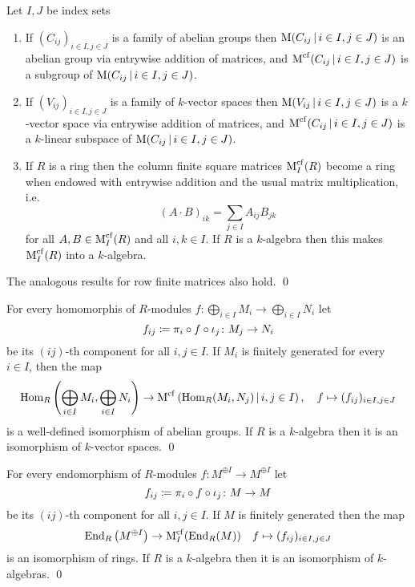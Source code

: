 \begin{lemma}
  \label{lemma: structure on infinite matrices}
  Let $I, J$ be index sets
  \begin{enumerate}
    \item
      If $(C_{ij})_{i \in I, j \in J}$ is a family of abelian groups then $\Mat(C_{ij} \suchthat i \in I, j \in J)$ is an abelian group via entrywise addition of matrices, and $\Mat^{\cf}(C_{ij} \suchthat i \in I, j \in J)$ is a subgroup of $\Mat(C_{ij} \suchthat i \in I, j \in J)$.
    \item
      If $(V_{ij})_{i \in I, j \in J}$ is a family of $k$-vector spaces then $\Mat(V_{ij} \suchthat i \in I, j \in J)$ is a $k$-vector space via entrywise addition of matrices, and $\Mat^{\cf}(C_{ij} \suchthat i \in I, j \in J)$ is a $k$-linear subspace of $\Mat(C_{ij} \suchthat i \in I, j \in J)$.
    \item
      If $R$ is a ring then the column finite square matrices $\operatorname{M}^{{\operatorname{cf}}}_I(R)$ become a ring when endowed with entrywise addition and the usual matrix multiplication, i.e.\
      \[
          (A \cdot B)_{ik}
        = \sum_{j \in I} A_{ij} B_{jk}
      \]
      for all $A, B \in \operatorname{M}^{{\operatorname{cf}}}_I(R)$ and all $i, k \in I$.
      If $R$ is a $k$-algebra then this makes $\operatorname{M}^{{\operatorname{cf}}}_I(R)$ into a $k$-algebra.
  \end{enumerate}
  The analogous results for row finite matrices also hold.
  \qed
\end{lemma}


\begin{corollary}
  For every homomorphis of $R$-modules $f \colon \bigoplus_{i \in I} M_i \to \bigoplus_{i \in I} N_i$ let
  \[
              f_{ij}
    \coloneqq  \pi_i \circ f \circ \iota_j
    \colon    M_j
    \to       N_i
  \]
  be its $(ij)$-th component for all $i, j \in I$.
  If $M_i$ is finitely generated for every $i \in I$, then the map
  \[
            \Hom_R\left( \bigoplus_{i \in I} M_i, \bigoplus_{i \in I} N_i \right)
    \to     \Mat^{\cf}\left( \Hom_R(M_i, N_j) \suchthat i,j \in I \right),
    \quad   f
    \mapsto (f_{ij})_{i \in I, j \in J}
  \]
  is a well-defined isomorphism of abelian groups.
  If $R$ is a $k$-algebra then it is an isomorphism of $k$-vector spaces.
  \qed
\end{corollary}


\begin{corollary}
  \label{corollary: endomorphism ring of sum power of fg module}
  For every endomorphism of $R$-modules $f \colon M^{\oplus I} \to M^{\oplus I}$ let
  \[
              f_{ij}
    \coloneqq  \pi_i \circ f \circ \iota_j
    \colon    M
    \to       M
  \]
  be its $(ij)$-th component for all $i, j \in I$.
  If $M$ is finitely generated then the map
    \[
            \operatorname{End}_R\left( M^{\oplus I} \right)
    \to     \operatorname{M}^{{\operatorname{cf}}}_I( \operatorname{End}_R(M) )
    \quad   f
    \mapsto (f_{ij})_{i \in I, j \in J}
  \]
  is an isomorphism of rings.
  If $R$ is a $k$-algebra then it is an isomorphism of $k$-algebras.
  \qed
\end{corollary}




